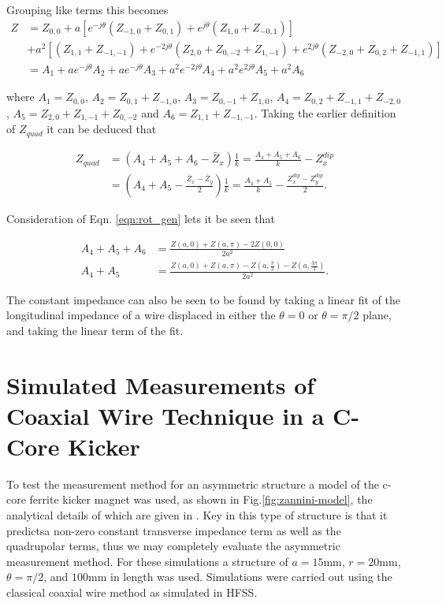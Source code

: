 \documentclass[review, number, sort&compress]{elsarticle}
\begin{document}
Grouping like terms this becomes
\begin{align}
Z   &=Z_{0,0} + a\left[ e^{-j\theta}\left( Z_{-1,0} + Z_{0,1} \right) +  e^{j\theta}\left( Z_{1,0} + Z_{-0,1} \right)\right] \nonumber \\
     &+a^{2}\left[ \left( Z_{1,1} + Z_{-1,-1} \right) + e^{-2j\theta} \left(  Z_{2,0} + Z_{0,-2} +Z_{1,-1} \right) + e^{2j\theta} \left( Z_{-2,0} + Z_{0,2} +Z_{-1,1} \right) \right] \nonumber \\
     &=A_{1} + ae^{-j\theta}A_{2} + ae^{-j\theta}A_{3}+ a^{2}e^{-2j\theta}A_{4} +a^{2}e^{2j\theta}A_{5} +  a^{2}A_{6}
\label{eqn:rot_gen}
\end{align}

where $A_{1} = Z_{0,0}$, $A_{2} = Z_{0,1}+Z_{-1,0}$, $A_{3} = Z_{0,-1}+Z_{1,0}$, $A_{4} = Z_{0,2}+Z_{-1,1}+Z_{-2,0}$, $A_{5} = Z_{2,0}+Z_{1,-1}+Z_{0,-2}$ and $A_{6}=Z_{1,1}+Z_{-1,-1}$. Taking the earlier definition of $Z_{quad}$ it can be deduced that

\begin{align}
Z_{quad} & = \left( A_{4}+A_{5}+A_{6} - \bar{Z}_{x} \right)\frac{1}{k} =\frac{ A_{4}+A_{5}+A_{6}}{k} - Z^{dip}_{x} \\  
	    & = \left( A_{4}+A_{5} - \frac{\bar{Z}_{x}- \bar{Z}_{y}}{2}\right)\frac{1}{k} =\frac{ A_{4}+A_{5}}{k} - \frac{Z^{dip}_{x}-Z^{dip}_{y} }{2}.
\end{align}

Consideration of Eqn. \ref{eqn:rot_gen} lets it be seen that

\begin{align}
 A_{4}+A_{5}+A_{6} & = \frac{Z\left( a,0 \right)+Z\left( a,\pi \right) - 2Z\left( 0,0 \right)}{2a^{2}} \\
 A_{4}+A_{5} & = \frac{Z\left( a,0 \right)+Z\left( a,\pi \right) - Z\left( a,\frac{\pi}{2} \right)-Z\left( a,\frac{3\pi}{2} \right)}{2a^{2}}.
\end{align}

The constant impedance can also be seen to be found by taking a linear fit of the longitudinal impedance of a wire displaced in either the $\theta = 0$ or $\theta = \pi / 2$ plane, and taking the linear term of the fit. 

\section{Simulated Measurements of Coaxial Wire Technique in a C-Core Kicker}
\label{sec:AsymSims}

To test the measurement method for an asymmetric structure a model of the c-core ferrite kicker magnet was used, as shown in Fig.\ref{fig:zannini-model}, the analytical details of which are given in \cite{Zannini:cCoreFerrite}. Key in this type of structure is that it predictsa non-zero constant transverse impedance term as well as the quadrupolar terms, thus we may completely evaluate the asymmetric measurement method. For these simulations a structure of $a=15$mm, $r=20$mm, $\theta = \pi / 2$, and $100$mm in length was used. Simulations were carried out using the classical coaxial wire method as simulated in HFSS.
\end{document}
